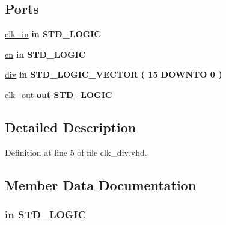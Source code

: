 \subsection*{Ports}
 \begin{DoxyCompactItemize}
\item 
\hyperlink{classclk__div_a57fad7f33f7766724bdea76e7b0330ef}{clk\+\_\+in}  {\bfseries {\bfseries \textcolor{keywordflow}{in}\textcolor{vhdlchar}{ }}} {\bfseries \textcolor{comment}{S\+T\+D\+\_\+\+L\+O\+G\+I\+C}\textcolor{vhdlchar}{ }} 
\item 
\hyperlink{classclk__div_a512588aa484615b7e90600a1bc9507b4}{en}  {\bfseries {\bfseries \textcolor{keywordflow}{in}\textcolor{vhdlchar}{ }}} {\bfseries \textcolor{comment}{S\+T\+D\+\_\+\+L\+O\+G\+I\+C}\textcolor{vhdlchar}{ }} 
\item 
\hyperlink{classclk__div_a425c2042b3ea21827b9b29c6712312d9}{div}  {\bfseries {\bfseries \textcolor{keywordflow}{in}\textcolor{vhdlchar}{ }}} {\bfseries \textcolor{comment}{S\+T\+D\+\_\+\+L\+O\+G\+I\+C\+\_\+\+V\+E\+C\+T\+O\+R}\textcolor{vhdlchar}{ }\textcolor{vhdlchar}{(}\textcolor{vhdlchar}{ }\textcolor{vhdlchar}{ } \textcolor{vhdldigit}{15} \textcolor{vhdlchar}{ }\textcolor{keywordflow}{D\+O\+W\+N\+T\+O}\textcolor{vhdlchar}{ }\textcolor{vhdlchar}{ } \textcolor{vhdldigit}{0} \textcolor{vhdlchar}{ }\textcolor{vhdlchar}{)}\textcolor{vhdlchar}{ }} 
\item 
\hyperlink{classclk__div_a8147ca5cedee84ed9753ac6f1f0b2374}{clk\+\_\+out}  {\bfseries {\bfseries \textcolor{keywordflow}{out}\textcolor{vhdlchar}{ }}} {\bfseries \textcolor{comment}{S\+T\+D\+\_\+\+L\+O\+G\+I\+C}\textcolor{vhdlchar}{ }} 
\end{DoxyCompactItemize}


\subsection{Detailed Description}


Definition at line 5 of file clk\+\_\+div.\+vhd.



\subsection{Member Data Documentation}
\hypertarget{classclk__div_a57fad7f33f7766724bdea76e7b0330ef}{}
\subsubsection[{clk\+\_\+in}]{ {\bfseries \textcolor{keywordflow}{in}\textcolor{vhdlchar}{ }} {\bfseries \textcolor{comment}{S\+T\+D\+\_\+\+L\+O\+G\+I\+C}\textcolor{vhdlchar}{ }} \hspace{0.3cm}{\ttfamily [Port]}}\label{classclk__div_a57fad7f33f7766724bdea76e7b0330ef}



